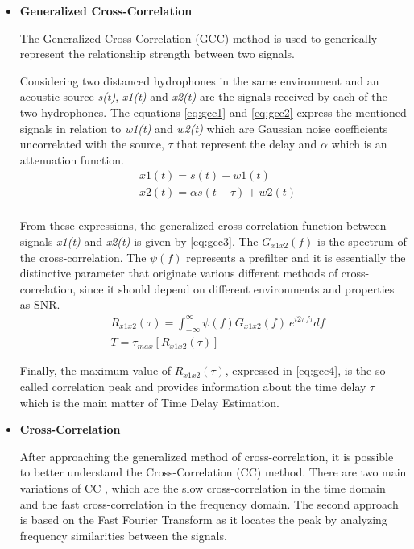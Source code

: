 \begin{itemize}
	\item \textbf{Generalized Cross-Correlation}

The Generalized Cross-Correlation (GCC) method is used to generically represent the relationship strength between two signals.

Considering two distanced hydrophones in the same environment and an acoustic source \textit{s(t)}, \textit{x1(t)} and \textit{x2(t)} are the signals received by each of the two hydrophones. The equations \ref{eq:gcc1} and \ref{eq:gcc2} \cite{crosscorr} express the mentioned signals in relation to \textit{w1(t)} and \textit{w2(t)} which are Gaussian noise coefficients uncorrelated with the source, $\tau$ that represent the delay and $\alpha$ which is an attenuation function.
\begin{eqnarray}
&x1(t) = s(t) + w1(t)
\label{eq:gcc1}\\
&x2(t) = \alpha s(t - \tau) + w2(t)
\label{eq:gcc2}\\
\end{eqnarray}

From these expressions, the generalized cross-correlation function between signals \textit{x1(t)} and \textit{x2(t)} is given by \ref{eq:gcc3}. The $G_{x1x2}(f)$ is the spectrum of the cross-correlation. The $\psi(f)$ represents a prefilter and it is essentially the distinctive parameter that originate various different methods of cross-correlation, since it should depend on different environments and properties as SNR. 
\begin{eqnarray}
& R_{x1x2}(\tau) = \int_{-\infty}^{\infty} \psi(f) G_{x1x2}(f)\ e^{i2\pi f\tau} df
\label{eq:gcc3}\\
& T = \tau_{max} [ R_{x1x2}(\tau) ]
\label{eq:gcc4}
\end{eqnarray}

Finally, the maximum value of $R_{x1x2}(\tau)$, expressed in \ref{eq:gcc4}, is the so called correlation peak and provides information about the time delay $\tau$ which is the main matter of Time Delay Estimation. 


	\item \textbf{Cross-Correlation}

After approaching the generalized method of cross-correlation, it is possible to better understand the Cross-Correlation (CC) method. There are two main variations of CC \cite{crosscorr}, which are the slow cross-correlation in the  time domain and the fast cross-correlation in the frequency domain. The second approach is based on the Fast Fourier Transform as it locates the peak by analyzing frequency similarities between the signals. 


\end{itemize}
